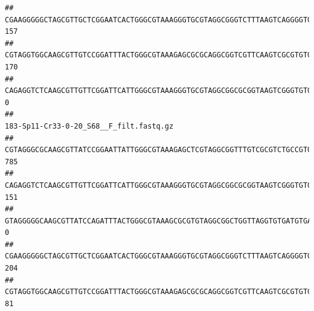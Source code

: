 \documentclass[]{article}
\begin{document}
\begin{verbatim}
## CGAAGGGGGCTAGCGTTGCTCGGAATCACTGGGCGTAAAGGGTGCGTAGGCGGGTCTTTAAGTCAGGGGTGAAATCCTGGAGCTCAACTCCAGAACTGCCTTTGATACTGAAGATCTTGAGTTCGGGAGAGGTGAGTGGAACTGCGAGTGTAGAGGTGAAATTCGTAGATATTCGCAAGAACACCAGTGGCGAAGGCGGCTCACTGGCCCGATACTGACGCTGAGGCACGAAAGCGTGGGGAGCAAACA                                     157
## CGTAGGTGGCAAGCGTTGTCCGGATTTACTGGGCGTAAAGAGCGCGCAGGCGGTCGTTCAAGTCGCGTGTGAAAGCCCCCGGCTCAACTGGGGAGGGTCACGCGATACTGATCGACTCGAAGGCAGGAGAGGGTAGTGGAATTCCCGGTGTAGTGGTGAAATGCGTAGATATCGGGAGGAACACCAGTGGCGAAGGCGACTACCTGGCCTGTTCTTGACGCTGAGGCGCGAAAGCTAGGGGAGCAAACG                                     170
## CAGAGGTCTCAAGCGTTGTTCGGATTCATTGGGCGTAAAGGGTGCGTAGGCGGCGCGGTAAGTCGGGTGTGAAATCTCGGGGCTTAACTCCGAAACTGCATTCGATACTGCCGTGCTTGAGGACTGGAGAGGAGACTGGAATTTACGGTGTAGCGGTGAAATGCGTAGATATCGTAAGGAAGACCAGTGGCGAAGGCGGGTCTCTGGACAGTTCCTGACGCTGAGGCACGAAGGCCAGGGGAGCAAACG                                       0
##                                                                                                                                                                                                                                                           183-Sp11-Cr33-0-20_S68__F_filt.fastq.gz
## CGTAGGGCGCAAGCGTTATCCGGAATTATTGGGCGTAAAGAGCTCGTAGGCGGTTTGTCGCGTCTGCCGTGAAAGTCCGGGGCTCAACTCCGGATCTGCGGTGGGTACGGGCAGACTAGAGTGATGTAGGGGAGACTGGAATTCCTGGTGTAGCGGTGAAATGCGCAGATATCAGGAGGAACACCGATGGCGAAGGCAGGTCTCTGGGCATTAACTGACGCTGAGGAGCGAAAGCATGGGGAGCGAACA                                     785
## CAGAGGTCTCAAGCGTTGTTCGGATTCATTGGGCGTAAAGGGTGCGTAGGCGGCGCGGTAAGTCGGGTGTGAAATCTCGGAGCTTAACTCCGAAACTGCATTCGATACTGCCGTGCTTGAGGACTGGAGAGGAGACTGGAATTTACGGTGTAGCGGTGAAATGCGTAGATATCGTAAGGAAGACCAGTGGCGAAGGCGGGTCTCTGGACAGTTCCTGACGCTGAGGCACGAAGGCCAGGGGAGCAAACG                                     151
## GTAGGGGGCAAGCGTTATCCAGATTTACTGGGCGTAAAGCGCGTGTAGGCGGCTGGTTAGGTGTGATGTGAAATCTTCCGGCTCAACCGGAAAACTGCATTGCAAACCGGCCTGGCTAGAGTGCAGGAGAGGGAAGCGGAATTCCAGGTGTAGCGGTGAAATGCGTAGATATCTGGAGGAACACCAGTGGCGAAGGCGGCTTCCTGGCCTGCAACTGACGCTGAGACGCGAAAGCGTGGGGAGCGAAC                                        0
## CGAAGGGGGCTAGCGTTGCTCGGAATCACTGGGCGTAAAGGGTGCGTAGGCGGGTCTTTAAGTCAGGGGTGAAATCCTGGAGCTCAACTCCAGAACTGCCTTTGATACTGAAGATCTTGAGTTCGGGAGAGGTGAGTGGAACTGCGAGTGTAGAGGTGAAATTCGTAGATATTCGCAAGAACACCAGTGGCGAAGGCGGCTCACTGGCCCGATACTGACGCTGAGGCACGAAAGCGTGGGGAGCAAACA                                     204
## CGTAGGTGGCAAGCGTTGTCCGGATTTACTGGGCGTAAAGAGCGCGCAGGCGGTCGTTCAAGTCGCGTGTGAAAGCCCCCGGCTCAACTGGGGAGGGTCACGCGATACTGATCGACTCGAAGGCAGGAGAGGGTAGTGGAATTCCCGGTGTAGTGGTGAAATGCGTAGATATCGGGAGGAACACCAGTGGCGAAGGCGACTACCTGGCCTGTTCTTGACGCTGAGGCGCGAAAGCTAGGGGAGCAAACG                                      81

\end{verbatim}
\end{document}
